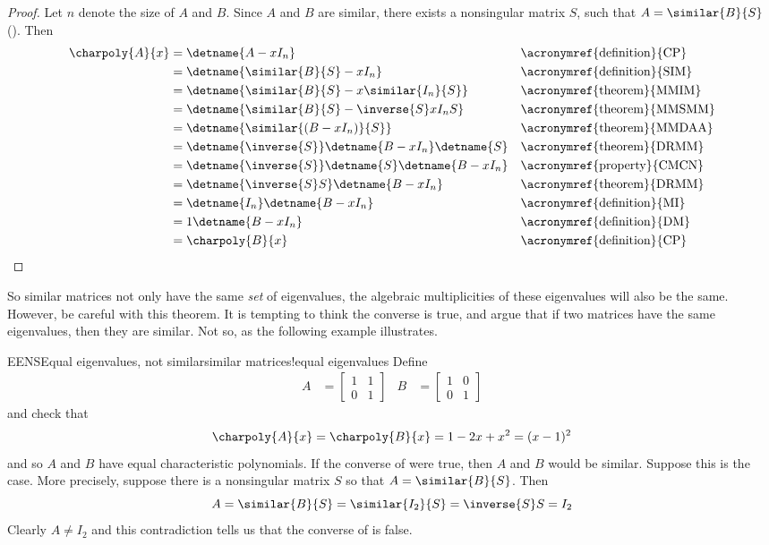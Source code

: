 %
\begin{proof}
Let $n$ denote the size of $A$ and $B$.  Since $A$ and $B$ are similar, there exists a nonsingular matrix $S$, such that $A=\similar{B}{S}$ ().  Then
%
\begin{align*}
\charpoly{A}{x}&=\detname{A-xI_n}&&\text{\acronymref{definition}{CP}}\\
&=\detname{\similar{B}{S}-xI_n}&&\text{\acronymref{definition}{SIM}}\\
&=\detname{\similar{B}{S}-x\similar{I_n}{S}}&&\text{\acronymref{theorem}{MMIM}}\\
&=\detname{\similar{B}{S}-\inverse{S}xI_nS}&&\text{\acronymref{theorem}{MMSMM}}\\
&=\detname{\similar{\left(B-xI_n\right)}{S}}&&\text{\acronymref{theorem}{MMDAA}}\\
&=\detname{\inverse{S}}\detname{B-xI_n}\detname{S}&&\text{\acronymref{theorem}{DRMM}}\\
&=\detname{\inverse{S}}\detname{S}\detname{B-xI_n}&&\text{\acronymref{property}{CMCN}}\\
&=\detname{\inverse{S}S}\detname{B-xI_n}&&\text{\acronymref{theorem}{DRMM}}\\
&=\detname{I_n}\detname{B-xI_n}&&\text{\acronymref{definition}{MI}}\\
&=1\detname{B-xI_n}&&\text{\acronymref{definition}{DM}}\\
&=\charpoly{B}{x}&&\text{\acronymref{definition}{CP}}
\end{align*}
%
\end{proof}
%
So similar matrices not only have the same {\em set} of eigenvalues, the algebraic multiplicities of these eigenvalues will also be the same.  However, be careful with this theorem.  It is tempting to think the converse is true, and argue that if two matrices have the same eigenvalues, then they are similar.  Not so, as the following example illustrates.
%
\begin{example}{EENS}{Equal eigenvalues, not similar}{similar matrices!equal eigenvalues}
Define
%
\begin{align*}
A&=\begin{bmatrix}1&1\\0&1\end{bmatrix}
&
B&=\begin{bmatrix}1&0\\0&1\end{bmatrix}
\end{align*}
%
and check that
%
\begin{equation*}
\charpoly{A}{x}=\charpoly{B}{x}=1-2x+x^2=(x-1)^2
\end{equation*}
%
and so $A$ and $B$ have equal characteristic polynomials.  If the converse of  were true, then $A$ and $B$ would be similar.  Suppose this is the case. More precisely, suppose there is a nonsingular matrix $S$ so that $A=\similar{B}{S}$.  Then
%
\begin{equation*}
A=\similar{B}{S}=\similar{I_2}{S}=\inverse{S}S=I_2
\end{equation*}
%
Clearly $A\neq I_2$ and this contradiction tells us that the converse of  is false.
%
\end{example}
